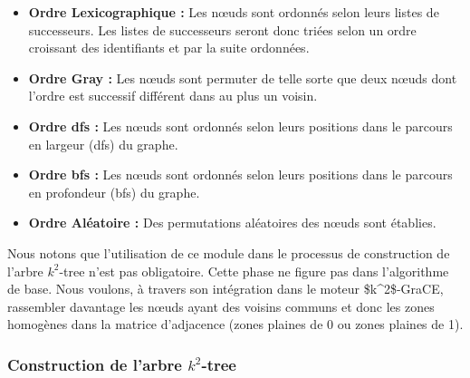 \documentclass[a4paper,oneside,12pt]{report}
\theoremstyle{definition}
\begin{document}
			\begin{itemize}[label=$\bullet$]
\item\textbf{Ordre Lexicographique :} Les nœuds sont ordonnés selon leurs listes de successeurs. Les listes de successeurs seront donc triées selon un ordre croissant des identifiants et par la suite ordonnées.

	
\item\textbf{Ordre Gray :} Les nœuds sont permuter de telle sorte que deux nœuds dont l'ordre est successif différent dans au plus un voisin. 
\item\textbf{Ordre \gls{dfs} :} Les nœuds sont ordonnés selon leurs positions dans le parcours en largeur (\gls{dfs}) du graphe.  
\item\textbf{Ordre \gls{bfs} :} Les nœuds sont ordonnés selon leurs positions dans le parcours en profondeur (\gls{bfs}) du graphe. 
\item\textbf{Ordre Aléatoire :} Des permutations aléatoires des nœuds sont établies.
			
			\end{itemize}

Nous notons que l'utilisation de ce module dans le processus de construction de l'arbre $k^2$-tree n'est pas obligatoire. Cette phase ne figure pas dans l'algorithme de base. Nous voulons, à travers son intégration dans le moteur \gls{$k^2$-GraCE}, rassembler davantage les nœuds ayant des voisins communs et donc les zones homogènes dans la matrice d'adjacence (zones plaines de 0 ou zones plaines de 1).			
		
			\subsubsection{Construction de l'arbre $k^2$-tree}
			
\end{document}
